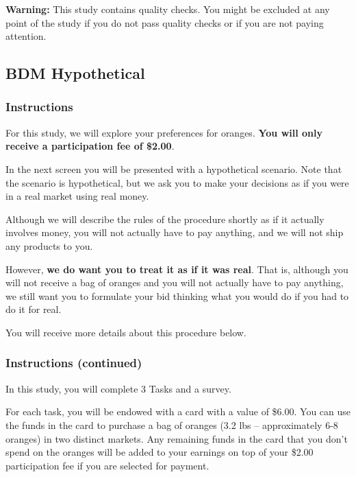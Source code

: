 \documentclass[12pt]{article}
\begin{document}
\vspace{1cm} %

\textbf{Warning:} This study contains quality checks. You might be excluded at any point of the study if you do not pass quality checks or if you are not paying attention.


\clearpage


\subsection{BDM Hypothetical}

\subsubsection*{Instructions }


For this study, we will explore your preferences for oranges. \textbf{You will only receive a participation fee of \$2.00}. \par

 In the next screen you will be presented with a hypothetical scenario. Note that the scenario is hypothetical, but we ask you to make your decisions as if you were in a real market using real money. \par

Although we will describe the rules of the procedure shortly as if it actually involves money, you will not actually have to pay anything, and we will not ship any products to you. \par

However,\textbf{ we do want you to treat it as if it was real}. That is, although you will not receive a bag of oranges and you will not actually have to pay anything, we still want you to formulate your bid thinking what you would do if you had to do it for real. \par

You will receive more details about this procedure below.

\clearpage



\subsubsection*{Instructions (continued)}

In this study, you will complete 3 Tasks and a survey.

For each task, you will be endowed with a card with a value of \$6.00. You can use the funds in the card to purchase a bag of oranges (3.2 lbs – approximately 6-8 oranges) in two distinct markets. Any remaining funds in the card that you don’t spend on the oranges will be added to your earnings on top of your \$2.00 participation fee if you are selected for payment.
\end{document}

